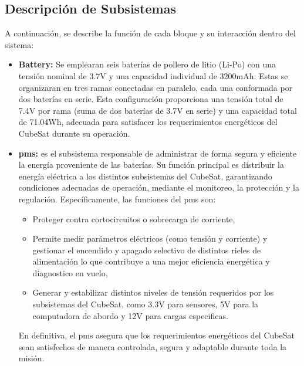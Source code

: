   \subsection{Descripción de Subsistemas}
    A continuación, se describe la función de cada bloque y su interacción dentro del sistema:
    \begin{itemize}
      \item \textbf{Battery:} Se emplearan seis baterías de pollero de litio (Li-Po) con una tensión nominal de 3.7V
      y una capacidad individual de 3200mAh. Estas se organizaran en tres ramas
      conectadas en paralelo, cada una conformada por dos baterías en serie. Esta configuración proporciona una tensión total de 7.4V por rama (suma de dos baterías de 3.7V en
      serie) y una capacidad total de 71.04Wh, adecuada para satisfacer los requerimientos
      energéticos del CubeSat durante su operación.

      \item \textbf{\acrfull{pms}:} es el subsistema responsable de administrar
      de forma segura y eficiente la energía proveniente de las baterías. Su función principal es
      distribuir la energía eléctrica a los distintos subsistemas del CubeSat, garantizando condiciones adecuadas de operación, mediante el monitoreo, la protección y la regulación.
      Específicamente, las funciones del \acrshort{pms} son:
      \begin{itemize}
        \item Proteger contra cortocircuitos o sobrecarga de corriente,
        \item Permite medir parámetros eléctricos (como tensión y corriente) y gestionar el
          encendido y apagado selectivo de distintos rieles de alimentación lo que contribuye
          a una mejor eficiencia energética y diagnostico en vuelo,
        \item Generar y estabilizar distintos niveles de tensión requeridos por los subsistemas
          del CubeSat, como 3.3V para sensores, 5V para la computadora de abordo y 12V
          para cargas especificas.
      \end{itemize}

      En definitiva, el \acrshort{pms} asegura que los requerimientos energéticos del CubeSat sean
      satisfechos de manera controlada, segura y adaptable durante toda la misión.


\end{itemize}

